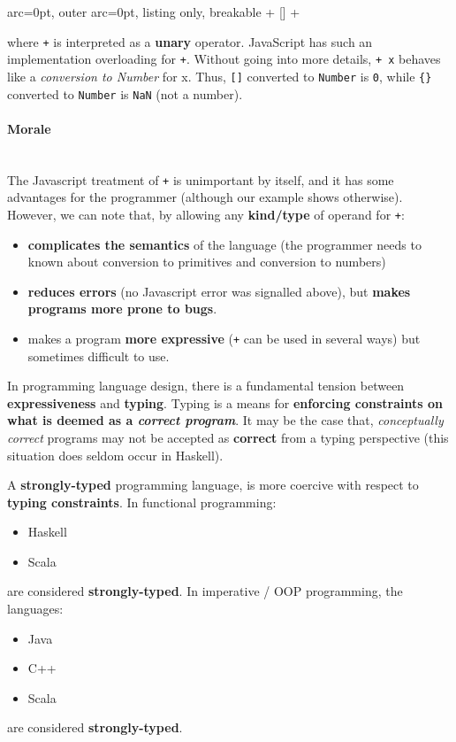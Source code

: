 \begin{tcblisting}{ arc=0pt, outer arc=0pt, listing only, breakable} 
+ []
+ {}

\end{tcblisting}


where \texttt{+} is interpreted as a \textbf{unary} operator. JavaScript has such an implementation overloading for \texttt{+}. Without going into more details, \texttt{+ x} behaves like a \textit{conversion to Number} for x. Thus, \texttt{[]} converted to \texttt{Number} is \texttt{0}, while \texttt{\{\}} converted to \texttt{Number} is \texttt{NaN} (not a number).

\paragraph{ Morale }\hfill\\

The Javascript treatment of \texttt{+} is unimportant by itself, and it has some advantages for the programmer (although our example shows otherwise). However, we can note that, by allowing any \textbf{kind/type} of operand for \texttt{+}:
\begin{itemize}
	\item  \textbf{complicates the semantics} of the language (the programmer needs to known about conversion to primitives and conversion to numbers)
	\item  \textbf{reduces errors} (no Javascript error was signalled above), but \textbf{makes programs more prone to bugs}.
	\item  makes a program \textbf{more expressive} (\texttt{+} can be used in several ways) but sometimes difficult to use.
\end{itemize}


In programming language design, there is a fundamental tension between \textbf{expressiveness} and \textbf{typing}. Typing is a means for \textbf{enforcing constraints on what is deemed as a \textit{correct program}}. It may be the case that, \textit{conceptually correct} programs may not be accepted as \textbf{correct} from a typing perspective (this situation does seldom occur in Haskell).

A \textbf{strongly-typed} programming language, is more coercive with respect to \textbf{typing constraints}. In functional programming:
\begin{itemize}
	\item  Haskell
	\item  Scala
\end{itemize}
are considered \textbf{strongly-typed}. In imperative / OOP programming, the languages:
\begin{itemize}
	\item  Java
	\item  C++
	\item  Scala
\end{itemize}
are considered \textbf{strongly-typed}.

